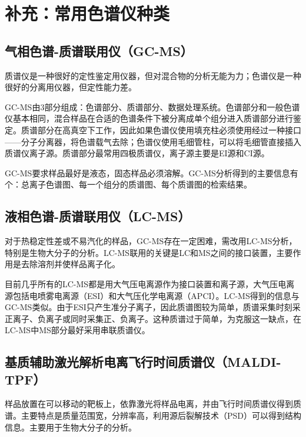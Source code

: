 \section*{补充：常用色谱仪种类}
\subsection*{气相色谱-质谱联用仪（GC-MS）}
质谱仪是一种很好的定性鉴定用仪器，但对混合物的分析无能为力；色谱仪是一种很好的分离用仪器，但定性能力差。

GC-MS由3部分组成：色谱部分、质谱部分、数据处理系统。色谱部分和一般色谱仪基本相同，混合样品在合适的色谱条件下被分离成单个组分进入质谱部分进行鉴定。质谱部分在高真空下工作，因此如果色谱仪使用填充柱必须使用经过一种接口——分子分离器，将色谱载气去除；色谱仪使用毛细管柱，可以将毛细管直接插入质谱仪离子源。质谱部分最常用四极质谱仪，离子源主要是EI源和CI源。

GC-MS要求样品最好是液态，固态样品必须溶解。GC-MS分析得到的主要信息有个：总离子色谱图、每一个组分的质谱图、每个质谱图的检索结果。
\subsection*{液相色谱-质谱联用仪（LC-MS）}
对于热稳定性差或不易汽化的样品，GC-MS存在一定困难，需改用LC-MS分析，特别是生物大分子的分析。LC-MS联用的关键是LC和MS之间的接口装置，主要作用是去除溶剂并使样品离子化。

目前几乎所有的LC-MS都是用大气压电离源作为接口装置和离子源，大气压电离源包括电喷雾电离源（ESI）和大气压化学电离源（APCI）。LC-MS得到的信息与GC-MS类似。由于ESI只产生准分子离子，因此质谱图较为简单，质谱采集时刻采正离子、负离子或同时采集正、负离子。这种质谱过于简单，为克服这一缺点，在LC-MS中MS部分最好采用串联质谱仪。
\subsection*{ 基质辅助激光解析电离飞行时间质谱仪（MALDI-TPF）}
  样品放置在可以移动的靶板上，依靠激光将样品电离，并由飞行时间质谱仪得到质谱。主要特点是质量范围宽，分辨率高，利用源后裂解技术（PSD）可以得到结构信息。主要用于生物大分子的分析。